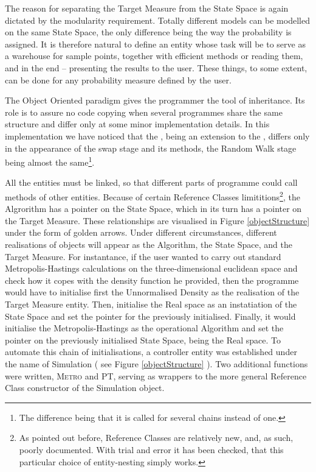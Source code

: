 The reason for separating the Target Measure from the State Space is again dictated by the modularity requirement. Totally different models can be modelled on the same State Space, the only difference being the way the probability is assigned. It is therefore natural to define an entity whose task will be to serve as a warehouse for sample points, together with efficient methods or reading them, and in the end -- presenting the results to the user. These things, to some extent, can be done for any probability measure defined by the user. 

The Object Oriented paradigm gives the programmer the tool of inheritance. Its role is to assure no code copying when several programmes share the same structure and differ only at some minor implementation details. In this implementation we have noticed that the \PT, being an extension to the \MH, differs only in the appearance of the swap stage and its methods, the Random Walk stage being almost the same\footnote{The difference being that it is called for several chains instead of one.}.    

All the entities must be linked, so that different parts of programme could call methods of other entities. Because of certain Reference Classes limititions\footnote{As pointed out before, Reference Classes are relatively new, and, as such, poorly documented. With trial and error it has been checked, that this particular choice of entity-nesting simply works.}, the Algrorithm has a pointer on the State Space, which in its turn has a pointer on the Target Measure. These relationships are visualised in Figure \ref{objectStructure} under the form of golden arrows. Under different circumstances, different realisations of objects will appear as the Algorithm, the State Space, and the Target Measure. For instantance, if the user wanted to carry out standard Metropolis-Hastings calculations on the three-dimensional euclidean space and check how it copes with the density function he provided, then the programme would have to initialise first the Unnormalised Density as the realisation of the Target Measure entity. Then, initialise the Real space as an instatiation of the State Space and set the pointer for the previously initialised. Finally, it would initialise the Metropolis-Hastings as the operational Algorithm and set the pointer on the previously initialised State Space, being the Real space. To automate this chain of initialisations, a controller entity was established under the name of Simulation ( see Figure \ref{objectStructure} ). Two additional functions were written, \textsc{Metro} and \textsc{PT}, serving as wrappers to the more general Reference Class constructor of the Simulation object. 

